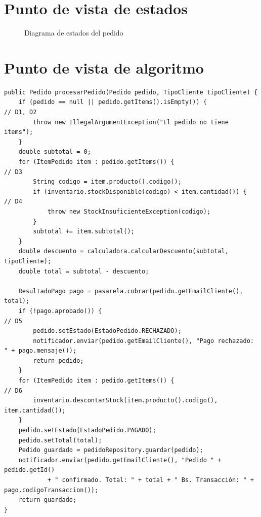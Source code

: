 \documentclass[11pt,a4paper,oneside]{report}
\newcommand{\code}[1]{\texttt{#1}}
\begin{document}
\section{Punto de vista de estados}
\begin{figure}[H]
\centering
{}
\caption{Diagrama de estados del pedido}
\end{figure}

\section{Punto de vista de algoritmo}
\begin{lstlisting}[caption={Método \code{procesarPedido} con sus decisiones marcadas (D1--D6)},label={lst:sut}]
public Pedido procesarPedido(Pedido pedido, TipoCliente tipoCliente) {
    if (pedido == null || pedido.getItems().isEmpty()) {                 // D1, D2
        throw new IllegalArgumentException("El pedido no tiene items");
    }
    double subtotal = 0;
    for (ItemPedido item : pedido.getItems()) {                          // D3
        String codigo = item.producto().codigo();
        if (inventario.stockDisponible(codigo) < item.cantidad()) {      // D4
            throw new StockInsuficienteException(codigo);
        }
        subtotal += item.subtotal();
    }
    double descuento = calculadora.calcularDescuento(subtotal, tipoCliente);
    double total = subtotal - descuento;

    ResultadoPago pago = pasarela.cobrar(pedido.getEmailCliente(), total);
    if (!pago.aprobado()) {                                              // D5
        pedido.setEstado(EstadoPedido.RECHAZADO);
        notificador.enviar(pedido.getEmailCliente(), "Pago rechazado: " + pago.mensaje());
        return pedido;
    }
    for (ItemPedido item : pedido.getItems()) {                          // D6
        inventario.descontarStock(item.producto().codigo(), item.cantidad());
    }
    pedido.setEstado(EstadoPedido.PAGADO);
    pedido.setTotal(total);
    Pedido guardado = pedidoRepository.guardar(pedido);
    notificador.enviar(pedido.getEmailCliente(), "Pedido " + pedido.getId()
            + " confirmado. Total: " + total + " Bs. Transacción: " + pago.codigoTransaccion());
    return guardado;
}
\end{lstlisting}
\end{document}
